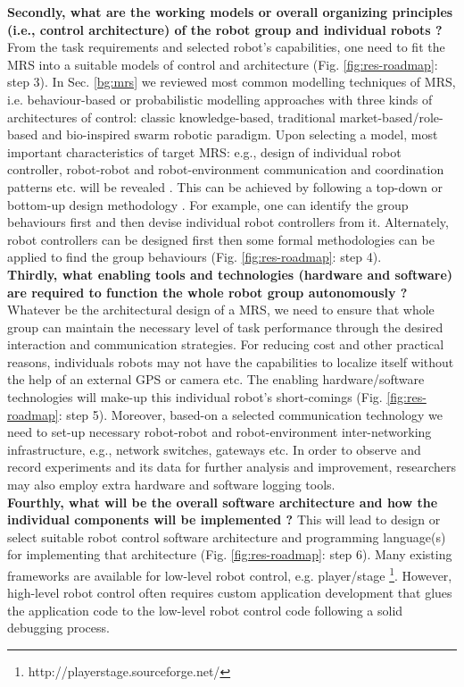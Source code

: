 \textbf{Secondly, what are the working models or overall organizing principles (i.e., control architecture) of the robot group and individual robots ?} From the task requirements and selected robot's capabilities, one need to fit the MRS into a suitable models of control and architecture (Fig. \ref{fig:res-roadmap}: step 3). In Sec. \ref{bg:mrs} we reviewed  most common modelling techniques of MRS, i.e. behaviour-based or probabilistic modelling approaches with three kinds of architectures of control: classic knowledge-based, traditional market-based/role-based and bio-inspired swarm robotic paradigm. Upon selecting a model, most important characteristics of target MRS: e.g., design of individual robot controller, robot-robot and robot-environment communication and coordination patterns etc. will be revealed . This can be achieved by following a top-down or bottom-up design methodology \cite{Crespi+2008}. For example, one can identify the group behaviours first and then devise individual robot controllers from it. Alternately, robot controllers can be designed first then some formal methodologies can be applied to find the group behaviours (Fig. \ref{fig:res-roadmap}: step 4).\\
\textbf{Thirdly, what enabling tools and technologies (hardware and software) are required to function the whole robot group autonomously ?} Whatever be the architectural design of a MRS, we need to ensure that whole group can maintain the necessary level of task performance through the desired interaction and communication strategies. For reducing cost and other practical reasons, individuals robots may not have the capabilities to localize itself without the help of an external GPS or camera etc. The enabling hardware/software technologies will make-up this individual robot's short-comings (Fig. \ref{fig:res-roadmap}: step 5). Moreover, based-on a selected communication technology we need to set-up necessary robot-robot and robot-environment inter-networking infrastructure, e.g., network switches, gateways etc. In order to observe and record experiments and its data for further analysis and improvement, researchers may also employ  extra hardware and software logging tools.\\
\textbf{Fourthly, what will be the overall software architecture and how the individual components will be implemented ?} This will lead to design or select suitable robot control software architecture and programming language(s) for implementing that architecture (Fig. \ref{fig:res-roadmap}: step 6). Many existing frameworks are available for low-level robot control, e.g. player/stage \footnote{http://playerstage.sourceforge.net/}. However, high-level robot control often requires custom application development that glues the application code to the low-level robot control code following a solid debugging process.\\
